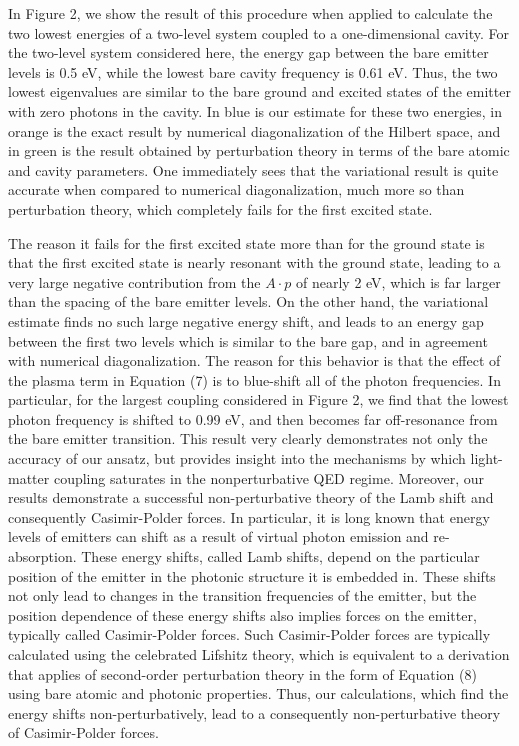\documentclass[aps,prl,twocolumn,
	groupedaddress,superscriptaddress,
	amsfonts,amssymb,amsmath,floatfix,
	citeautoscript]{revtex4-1}
\begin{document}
In Figure 2, we show the result of this procedure when applied to calculate the two lowest energies of a two-level system coupled to a one-dimensional cavity. For the two-level system considered here, the energy gap between the bare emitter levels is 0.5 eV, while the lowest bare cavity frequency is 0.61 eV. Thus, the two lowest eigenvalues are similar to the bare ground and excited states of the emitter with zero photons in the cavity. In blue is our estimate for these two energies, in orange is the exact result by numerical diagonalization of the Hilbert space, and in green is the result obtained by perturbation theory in terms of the bare atomic and cavity parameters. One immediately sees that the variational result is quite accurate when compared to numerical diagonalization, much more so than perturbation theory, which completely fails for the first excited state. 

The reason it fails for the first excited state more than for the ground state is that the first excited state is nearly resonant with the ground state, leading to a very large negative contribution from the $A\cdot p$ of nearly 2 eV, which is far larger than the spacing of the bare emitter levels. On the other hand, the variational estimate finds no such large negative energy shift, and leads to an energy gap between the first two levels which is similar to the bare gap, and in agreement with numerical diagonalization. The reason for this behavior is that the effect of the plasma term in Equation (7) is to blue-shift all of the photon frequencies. In particular, for the largest coupling considered in Figure 2, we find that the lowest photon frequency is shifted to 0.99 eV, and then becomes far off-resonance from the bare emitter transition. This result very clearly demonstrates not only the accuracy of our ansatz, but provides insight into the mechanisms by which light-matter coupling saturates in the nonperturbative QED regime. Moreover, our results demonstrate a successful non-perturbative theory of the Lamb shift and consequently Casimir-Polder forces. In particular, it is long known that energy levels of emitters can shift as a result of virtual photon emission and re-absorption. These energy shifts, called Lamb shifts, depend on the particular position of the emitter in the photonic structure it is embedded in. These shifts not only lead to changes in the transition frequencies of the emitter, but the position dependence of these energy shifts also implies forces on the emitter, typically called Casimir-Polder forces. Such Casimir-Polder forces are typically calculated using the celebrated Lifshitz theory, which is equivalent to a derivation that applies of second-order perturbation theory in the form of Equation (8) using bare atomic and photonic properties. Thus, our calculations, which find the energy shifts non-perturbatively, lead to a consequently non-perturbative theory of Casimir-Polder forces. 
\end{document}
